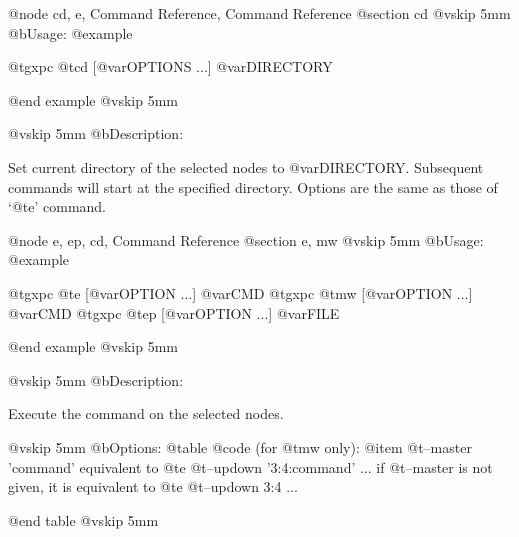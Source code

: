 @node cd, e, Command Reference, Command Reference
@section cd
@vskip 5mm
@b{Usage:}
@example

  @t{gxpc} @t{cd} [@var{OPTIONS} ...] @var{DIRECTORY}

@end example
@vskip 5mm

@vskip 5mm
@b{Description:}


  Set current directory of the selected nodes to @var{DIRECTORY}.
Subsequent commands will start at the specified directory.
Options are the same as those of `@t{e}' command.

@node e, ep, cd, Command Reference
@section e, mw
@vskip 5mm
@b{Usage:}
@example

  @t{gxpc} @t{e}  [@var{OPTION} ...] @var{CMD}
  @t{gxpc} @t{mw} [@var{OPTION} ...] @var{CMD}
  @t{gxpc} @t{ep} [@var{OPTION} ...] @var{FILE}

@end example
@vskip 5mm

@vskip 5mm
@b{Description:}


  Execute the command on the selected nodes.

@vskip 5mm
@b{Options: }
@table @code
(for @t{mw} only):
@item   @t{--master} 'command'
    equivalent to @t{e} @t{--updown} '3:4:command' ...
  if @t{--master} is not given, it is equivalent to @t{e} @t{--updown} 3:4 ...

@end table
@vskip 5mm

